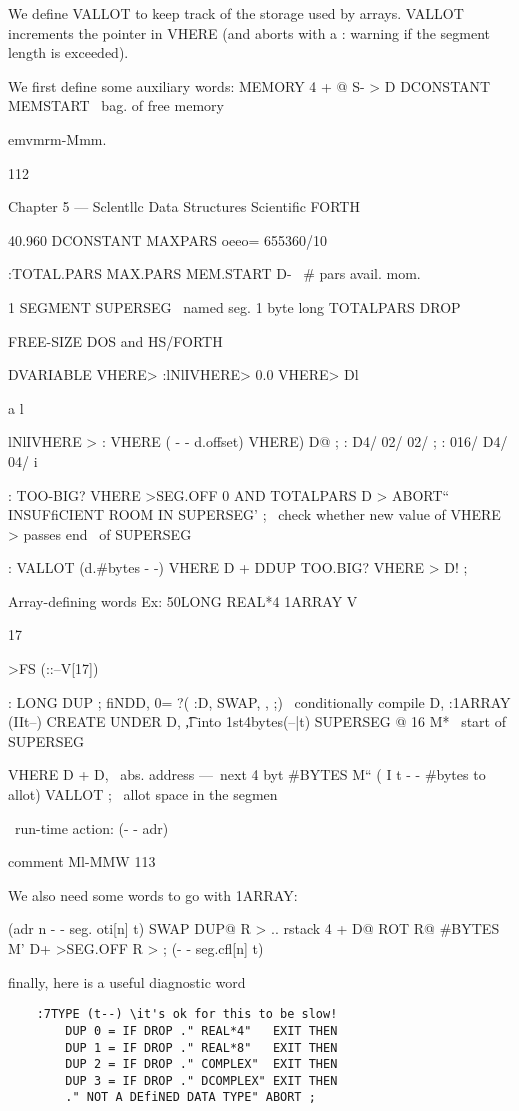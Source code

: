 {{We define VALLOT to keep track of the storage used by arrays.
VALLOT increments the pointer in VHERE (and aborts with a
: warning if the segment length is exceeded).

We first define some auxiliary words:
MEMORY 4 + @
S- > D DCONSTANT MEMSTART
\ bag. of free memory

emvmrm-Mmm.

112

Chapter 5 — Sclentllc Data Structures Scientific FORTH

40.960 DCONSTANT MAXPARS \4oeeo= 655360/10

:TOTAL.PARS MAX.PARS MEM.START D-
\ # pars avail. mom.

1 SEGMENT SUPERSEG \ named seg. 1 byte long
TOTALPARS DROP

FREE-SIZE \tell DOS and HS/FORTH

DVARIABLE VHERE>
:lNlIVHERE> 0.0 VHERE> Dl

a
l

lNlIVHERE >
: VHERE ( - - d.offset) VHERE) D@ ;
: D4/ 02/ 02/ ; : 016/ D4/ 04/ i

: TOO-BIG? VHERE >SEG.OFF
0 AND TOTALPARS D >
ABORT“ INSUFfiCIENT ROOM IN SUPERSEG' ;
\ check whether new value of VHERE > passes end
\ of SUPERSEG

: VALLOT (d.#bytes - -)
VHERE D + DDUP TOO.BIG?
VHERE > D! ;

Array-defining words
Ex: 50LONG REAL*4 1ARRAY V{

17} >FS (::--V[17])

: LONG DUP ;
fiNDD, 0= ?( :D, SWAP, , ;)
\ conditionally compile D,
:1ARRAY (IIt--)
CREATE UNDER D, \t,l into 1st4bytes(--|t)
SUPERSEG @ 16 M* \ start of SUPERSEG

VHERE D + D, \ abs. address —~next 4 byt
#BYTES M“ ( I t - - #bytes to allot)
VALLOT ; \ allot space in the segmen

\ run-time action: (- - adr)

comment Ml-MMW 113

We also need some words to go with 1ARRAY:

(adr n - - seg. oti[n] t)
SWAP DUP@ R > \fypo .. rstack
4 + D@
ROT R@ #BYTES M'
D+ >SEG.OFF R > ; (- - seg.cfl[n] t)

finally, here is a useful diagnostic word

\begin{lstlisting}
    :7TYPE (t--) \it's ok for this to be slow!
        DUP 0 = IF DROP ." REAL*4"   EXIT THEN
        DUP 1 = IF DROP ." REAL*8"   EXIT THEN
        DUP 2 = IF DROP ." COMPLEX"  EXIT THEN
        DUP 3 = IF DROP ." DCOMPLEX" EXIT THEN
        ." NOT A DEfiNED DATA TYPE" ABORT ;
\end{lstlisting}

}}
